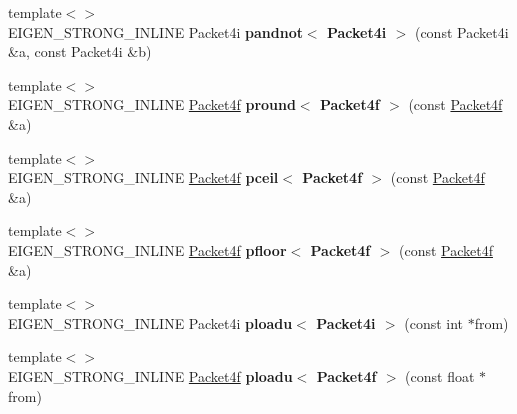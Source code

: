 \begin{DoxyCompactItemize}
\item 
\mbox{\label{namespace_eigen_1_1internal_a772cc969145ff34b2f97462768acd7ac}} 
{\footnotesize template$<$$>$ }\\E\+I\+G\+E\+N\+\_\+\+S\+T\+R\+O\+N\+G\+\_\+\+I\+N\+L\+I\+NE Packet4i {\bfseries pandnot$<$ Packet4i $>$} (const Packet4i \&a, const Packet4i \&b)
\item 
\mbox{\label{namespace_eigen_1_1internal_aeb781b776890304f95de04eb38334c21}} 
{\footnotesize template$<$$>$ }\\E\+I\+G\+E\+N\+\_\+\+S\+T\+R\+O\+N\+G\+\_\+\+I\+N\+L\+I\+NE \hyperlink{struct_eigen_1_1internal_1_1_packet4f}{Packet4f} {\bfseries pround$<$ Packet4f $>$} (const \hyperlink{struct_eigen_1_1internal_1_1_packet4f}{Packet4f} \&a)
\item 
\mbox{\label{namespace_eigen_1_1internal_a9d844855a379b4eea125140139fe5c40}} 
{\footnotesize template$<$$>$ }\\E\+I\+G\+E\+N\+\_\+\+S\+T\+R\+O\+N\+G\+\_\+\+I\+N\+L\+I\+NE \hyperlink{struct_eigen_1_1internal_1_1_packet4f}{Packet4f} {\bfseries pceil$<$ Packet4f $>$} (const \hyperlink{struct_eigen_1_1internal_1_1_packet4f}{Packet4f} \&a)
\item 
\mbox{\label{namespace_eigen_1_1internal_a7320ad2f9ea3e75c263fa8839b8fd89f}} 
{\footnotesize template$<$$>$ }\\E\+I\+G\+E\+N\+\_\+\+S\+T\+R\+O\+N\+G\+\_\+\+I\+N\+L\+I\+NE \hyperlink{struct_eigen_1_1internal_1_1_packet4f}{Packet4f} {\bfseries pfloor$<$ Packet4f $>$} (const \hyperlink{struct_eigen_1_1internal_1_1_packet4f}{Packet4f} \&a)
\item 
\mbox{\label{namespace_eigen_1_1internal_a8ca7358422bc5068a529fb12256f17c0}} 
{\footnotesize template$<$$>$ }\\E\+I\+G\+E\+N\+\_\+\+S\+T\+R\+O\+N\+G\+\_\+\+I\+N\+L\+I\+NE Packet4i {\bfseries ploadu$<$ Packet4i $>$} (const int $\ast$from)
\item 
\mbox{\label{namespace_eigen_1_1internal_ac7c8e9806e423b61bb6ec916769bd133}} 
{\footnotesize template$<$$>$ }\\E\+I\+G\+E\+N\+\_\+\+S\+T\+R\+O\+N\+G\+\_\+\+I\+N\+L\+I\+NE \hyperlink{struct_eigen_1_1internal_1_1_packet4f}{Packet4f} {\bfseries ploadu$<$ Packet4f $>$} (const float $\ast$from)

\end{DoxyCompactItemize}

